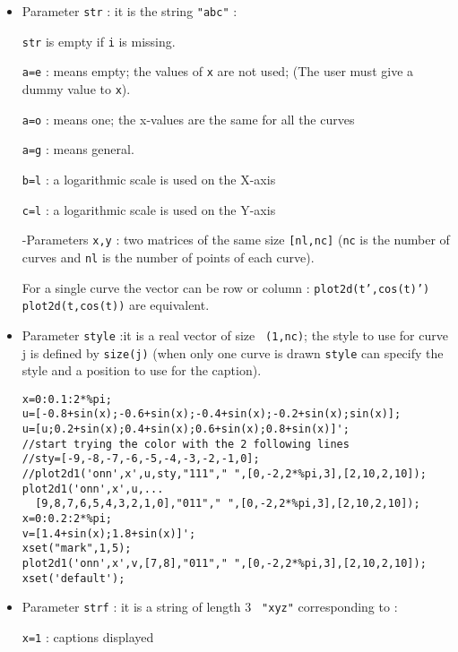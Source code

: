 

\begin{itemize}

\item Parameter {\tt str}  	: it is the string {\tt "abc"} :
 
	{\tt str} is empty if {\tt i} is missing.

	{\tt a=e} : means empty; the values of {\tt x} are not used;
	   (The user must give a dummy value to {\tt x}).

	{\tt a=o} : means one; the x-values are the same for all the curves

	{\tt a=g} : means general. 

	{\tt b=l} : a logarithmic scale is used on the X-axis

	{\tt c=l} : a logarithmic scale is used on the Y-axis

-Parameters {\tt x,y} : two matrices of the same size {\tt [nl,nc]} ({\tt nc} 
is the number of curves and {\tt nl} is the number of points of each
curve).

For a single curve the vector can be row or column : 
{\tt plot2d(t',cos(t)')  plot2d(t,cos(t))} are equivalent.


\item Parameter {\tt style}  	:it is a real vector of size {\tt
(1,nc)}; the style 
to use for curve j is defined by {\tt size(j)} (when only one curve is drawn 
{\tt style} can specify the style and a position to use for the
caption).

\begin{verbatim}
x=0:0.1:2*%pi;
u=[-0.8+sin(x);-0.6+sin(x);-0.4+sin(x);-0.2+sin(x);sin(x)];
u=[u;0.2+sin(x);0.4+sin(x);0.6+sin(x);0.8+sin(x)]';   
//start trying the color with the 2 following lines
//sty=[-9,-8,-7,-6,-5,-4,-3,-2,-1,0];
//plot2d1('onn',x',u,sty,"111"," ",[0,-2,2*%pi,3],[2,10,2,10]);
plot2d1('onn',x',u,...
  [9,8,7,6,5,4,3,2,1,0],"011"," ",[0,-2,2*%pi,3],[2,10,2,10]);
x=0:0.2:2*%pi; 
v=[1.4+sin(x);1.8+sin(x)]'; 
xset("mark",1,5);
plot2d1('onn',x',v,[7,8],"011"," ",[0,-2,2*%pi,3],[2,10,2,10]);
xset('default');
\end{verbatim}



\item Parameter {\tt strf}  	: it is a string of length 3 {\tt
"xyz"} corresponding to :

	    {\tt x=1} : captions  displayed 


\end{itemize}

